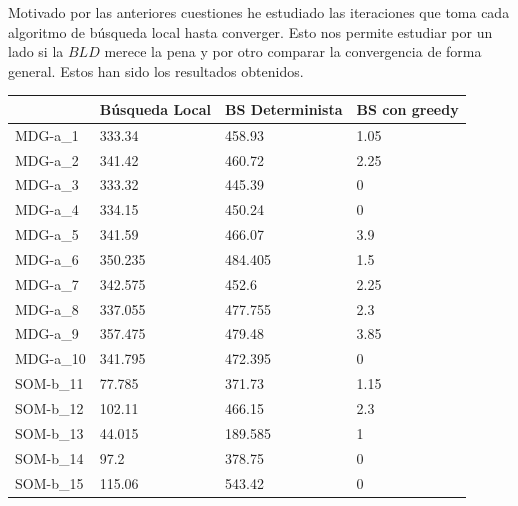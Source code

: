 \documentclass[11pt,a4paper]{article}
\begin{document}
	Motivado por las anteriores cuestiones he estudiado las iteraciones que toma cada algoritmo de búsqueda local hasta converger. Esto nos permite estudiar por un lado si la $BLD$ merece la pena y por otro comparar la convergencia de forma general. Estos han sido los resultados obtenidos. \\
	
	\begin{center}
		\begin{table}[H]
			\begin{tabular}{l|l|l|l|}
				\cline{2-4}
				& Búsqueda Local & BS Determinista & BS con greedy \\ \hline
				\multicolumn{1}{|l|}{MDG-a\_1}  & 333.34         & 458.93          & 1.05          \\ \hline
				\multicolumn{1}{|l|}{MDG-a\_2}  & 341.42         & 460.72          & 2.25          \\ \hline
				\multicolumn{1}{|l|}{MDG-a\_3}  & 333.32         & 445.39          & 0             \\ \hline
				\multicolumn{1}{|l|}{MDG-a\_4}  & 334.15         & 450.24          & 0             \\ \hline
				\multicolumn{1}{|l|}{MDG-a\_5}  & 341.59         & 466.07          & 3.9           \\ \hline
				\multicolumn{1}{|l|}{MDG-a\_6}  & 350.235        & 484.405         & 1.5           \\ \hline
				\multicolumn{1}{|l|}{MDG-a\_7}  & 342.575        & 452.6           & 2.25          \\ \hline
				\multicolumn{1}{|l|}{MDG-a\_8}  & 337.055        & 477.755         & 2.3           \\ \hline
				\multicolumn{1}{|l|}{MDG-a\_9}  & 357.475        & 479.48          & 3.85          \\ \hline
				\multicolumn{1}{|l|}{MDG-a\_10} & 341.795        & 472.395         & 0             \\ \hline
				\multicolumn{1}{|l|}{SOM-b\_11} & 77.785         & 371.73          & 1.15          \\ \hline
				\multicolumn{1}{|l|}{SOM-b\_12} & 102.11         & 466.15          & 2.3           \\ \hline
				\multicolumn{1}{|l|}{SOM-b\_13} & 44.015         & 189.585         & 1             \\ \hline
				\multicolumn{1}{|l|}{SOM-b\_14} & 97.2           & 378.75          & 0             \\ \hline
				\multicolumn{1}{|l|}{SOM-b\_15} & 115.06         & 543.42          & 0             \\ \hline

\end{tabular}
\end{table}
\end{center}
\end{document}
